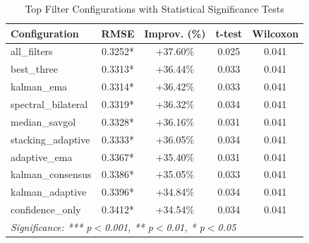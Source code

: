 \begin{table}[htbp]
\centering
\caption{Top Filter Configurations with Statistical Significance Tests}
\label{tab:statistical-significance}
\begin{tabular}{l|c|c|c|c}
\hline
\textbf{Configuration} & \textbf{RMSE} & \textbf{Improv. (\%)} & \textbf{t-test} & \textbf{Wilcoxon} \\
\hline
all\_filters & 0.3252* & +37.60\% & 0.025 & 0.041 \\
best\_three & 0.3313* & +36.44\% & 0.033 & 0.041 \\
kalman\_ema & 0.3314* & +36.42\% & 0.033 & 0.041 \\
spectral\_bilateral & 0.3319* & +36.32\% & 0.034 & 0.041 \\
median\_savgol & 0.3328* & +36.16\% & 0.031 & 0.041 \\
stacking\_adaptive & 0.3333* & +36.05\% & 0.034 & 0.041 \\
adaptive\_ema & 0.3367* & +35.40\% & 0.031 & 0.041 \\
kalman\_consensus & 0.3386* & +35.05\% & 0.033 & 0.041 \\
kalman\_adaptive & 0.3396* & +34.84\% & 0.034 & 0.041 \\
confidence\_only & 0.3412* & +34.54\% & 0.034 & 0.041 \\
\hline
\multicolumn{5}{l}{\textit{Significance: *** p$<$0.001, ** p$<$0.01, * p$<$0.05}} \\
\hline
\end{tabular}
\end{table}